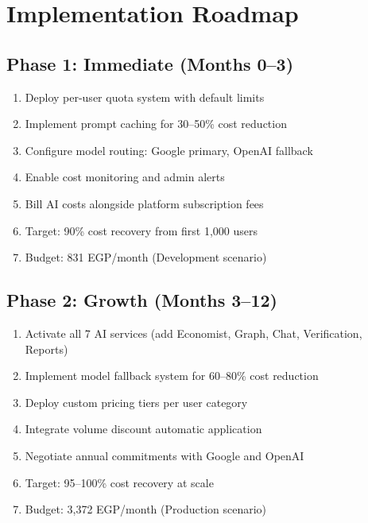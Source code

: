 \documentclass[11pt,a4paper]{article}
\begin{document}
\newpage

\section{Implementation Roadmap}

\subsection{Phase 1: Immediate (Months 0--3)}

\begin{enumerate}[leftmargin=2em]
    \item Deploy per-user quota system with default limits
    \item Implement prompt caching for 30--50\% cost reduction
    \item Configure model routing: Google primary, OpenAI fallback
    \item Enable cost monitoring and admin alerts
    \item Bill AI costs alongside platform subscription fees
    \item Target: 90\% cost recovery from first 1,000 users
    \item Budget: 831 EGP/month (Development scenario)
\end{enumerate}

\subsection{Phase 2: Growth (Months 3--12)}

\begin{enumerate}[leftmargin=2em]
    \item Activate all 7 AI services (add Economist, Graph, Chat, Verification, Reports)
    \item Implement model fallback system for 60--80\% cost reduction
    \item Deploy custom pricing tiers per user category
    \item Integrate volume discount automatic application
    \item Negotiate annual commitments with Google and OpenAI
    \item Target: 95--100\% cost recovery at scale
    \item Budget: 3,372 EGP/month (Production scenario)
\end{enumerate}
\end{document}
